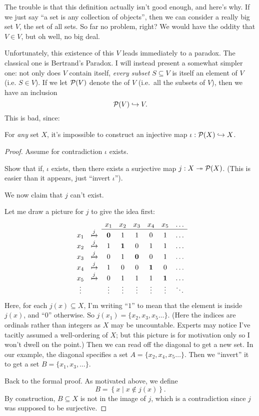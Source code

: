 The trouble is that this definition actually isn't good enough, and here's why.
If we just say ``a set is any collection of objects'',
then we can consider a really big set $V$, the set of all sets.
So far no problem, right?
We would have the oddity that $V \in V$,
but oh well, no big deal.

Unfortunately, this existence of this $V$ leads immediately to a paradox.
The classical one is Bertrand's Paradox.
I will instead present a somewhat simpler one:
not only does $V$ contain itself, \emph{every subset $S \subseteq V$}
is itself an element of $V$ (i.e. $S \in V$).
If we let $\mathcal P(V)$ denote the  of $V$
(i.e.\ all the subsets of $V$), then we have an inclusion
\[ \mathcal P(V) \hookrightarrow V. \]
This is bad, since:
\begin{lemma}
	\label{lem:cantor_diag}
	For \emph{any} set $X$, it's impossible to construct an injective
	map $\iota : \mathcal P(X) \hookrightarrow X$.
\end{lemma}
\begin{proof}
	Assume for contradiction $\iota$ exists.
	\begin{exercise}
		Show that if, $\iota$ exists,
		then there exists a surjective map $j : X \twoheadrightarrow \mathcal P(X)$.
		(This is easier than it appears, just ``invert $\iota$'').
	\end{exercise}
	We now claim that $j$ can't exist.

	Let me draw a picture for $j$ to give the idea first:
	\[
		\begin{array}{cccccccc}
			&& x_1 & x_2 & x_3 & x_4 & x_5 & \dots \\ \cline{3-8}
			x_1 & \xmapsto{j} & \mathbf0 & 1 & 1 & 0 & 1 & \dots \\
			x_2 & \xmapsto{j} & 1 & \mathbf1 & 0 & 1 & 1 & \dots \\
			x_3 & \xmapsto{j} & 0 & 1 & \mathbf0 & 0 & 1 & \dots \\
			x_4 & \xmapsto{j} & 1 & 0 & 0 & \mathbf1 & 0 & \dots \\
			x_5 & \xmapsto{j} & 0 & 1 & 1 & 1 & \mathbf1 & \dots \\
			\vdots && \vdots & \vdots & \vdots & \vdots & \vdots & \ddots
		\end{array}
	\]
	Here, for each $j(x) \subseteq X$, I'm writing ``$1$'' to mean that
	the element is inside $j(x)$, and ``$0$'' otherwise.
	So $j(x_1) = \{x_2, x_3, x_5 \dots\}$.
	(Here the indices are ordinals rather than integers
	as $X$ may be uncountable.
	Experts may notice I've tacitly assumed a well-ordering of $X$;
	but this picture is for motivation only so I won't dwell on the point.)
	Then we can read off the diagonal to get a new set.
	In our example, the diagonal specifies a set
	$A = \{x_2, x_4, x_5 \dots\}$.
	Then we ``invert'' it to get a set $B = \{x_1, x_3, \dots\}$.

	Back to the formal proof. As motivated above, we define
	\[ B = \left\{ x \mid x \notin j(x) \right\}. \]
	By construction, $B \subseteq X$ is not in the image of $j$,
	which is a contradiction since $j$ was supposed to be surjective.
\end{proof}

